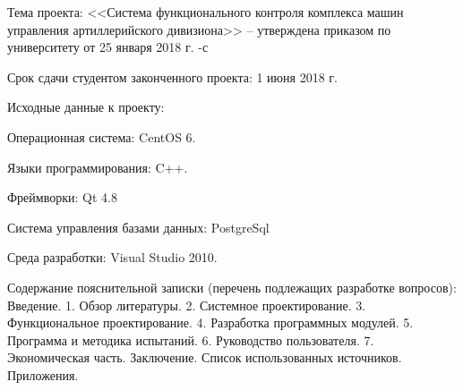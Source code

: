 {    \begin{flushleft}
        \begin{legal}
        \item Тема проекта: <<Система функционального контроля комплекса машин управления артиллерийского дивизиона>> --
            утверждена приказом по университету от 25 января 2018 г. -с

            \vspace{1em}

        \item Срок сдачи студентом законченного проекта: 1 июня 2018 г.

            \vspace{1em}

        \item Исходные данные к проекту:

            \begin{legal}
            \item Операционная система: CentOS 6.
            \item Языки программирования: C++.
            \item Фреймворки: Qt 4.8
            \item Система управления базами данных: PostgreSql
            \item Среда разработки: Visual Studio 2010.
            \end{legal}

            \vspace{1em}

        \item Содержание пояснительной записки (перечень подлежащих разработке вопросов):
            Введение.
            1. Обзор литературы.
            2. Системное проектирование.
            3. Функциональное проектирование.
            4. Разработка программных модулей.
            5. Программа и методика испытаний.
            6. Руководство пользователя.
            7. Экономическая часть.
            Заключение.
            Список использованных источников.
            Приложения.

            \vspace{1em}


\end{legal}
\end{flushleft}}
